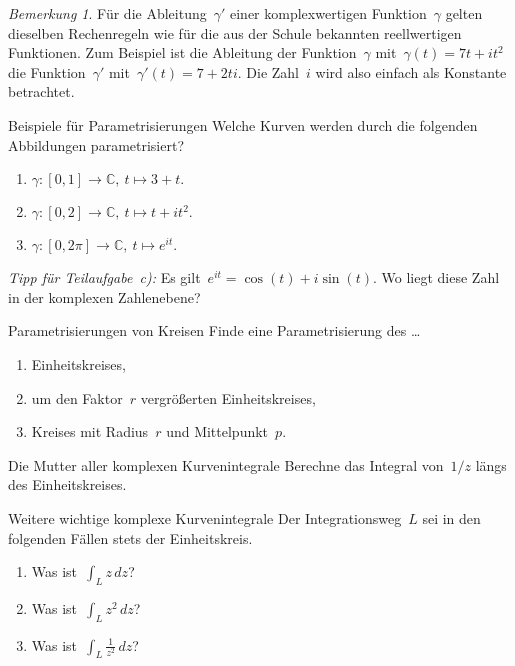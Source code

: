 \documentclass[twoside]{../zirkelblatt1415}
\theoremstyle{definition}
\theoremstyle{plain}
\theoremstyle{remark}
\newtheorem{bem}[defn]{Bemerkung}
\newcommand{\CC}{\mathbb{C}}
\begin{document}
\begin{bem}Für die Ableitung~$\gamma'$ einer komplexwertigen Funktion~$\gamma$
gelten dieselben Rechenregeln wie für die aus der Schule bekannten
reellwertigen Funktionen. Zum Beispiel ist die Ableitung der Funktion~$\gamma$
mit~$\gamma(t) = 7t + i t^2$ die Funktion~$\gamma'$ mit~$\gamma'(t) = 7 + 2ti$.
Die Zahl~$i$ wird also einfach als Konstante betrachtet.
\end{bem}

\begin{aufgabe}{Beispiele für Parametrisierungen}
Welche Kurven werden durch die folgenden Abbildungen parametrisiert?
\begin{enumerate}
\item $\gamma : [0,1] \to \CC,\ t \mapsto 3+t.$
\item $\gamma : [0,2] \to \CC,\ t \mapsto t + i t^2.$
\item $\gamma : [0,2\pi] \to \CC,\ t \mapsto e^{it}.$
\end{enumerate}
\emph{Tipp für Teilaufgabe~c):} Es gilt~$e^{it} = \cos(t) + i \sin(t)$. Wo
liegt diese Zahl in der komplexen Zahlenebene?
\end{aufgabe}

\begin{aufgabe}{Parametrisierungen von Kreisen}
Finde eine Parametrisierung des \ldots
\begin{enumerate}
\item Einheitskreises,
\item um den Faktor~$r$ vergrößerten Einheitskreises,
\item Kreises mit Radius~$r$ und Mittelpunkt~$p$.
\end{enumerate}
\fixlistspacing
\end{aufgabe}

\begin{aufgabe}{Die Mutter aller komplexen Kurvenintegrale}
Berechne das Integral von~$1/z$ längs des Einheitskreises.
\end{aufgabe}

\begin{aufgabe}{Weitere wichtige komplexe Kurvenintegrale}
Der Integrationsweg~$L$ sei in den folgenden Fällen stets der Einheitskreis.
\begin{enumerate}
\item Was ist~$\int_L z \,dz$?
\item Was ist~$\int_L z^2 \,dz$?
\item Was ist~$\int_L \frac{1}{z^2} \,dz$?
\end{enumerate}
\end{aufgabe}
\end{document}
